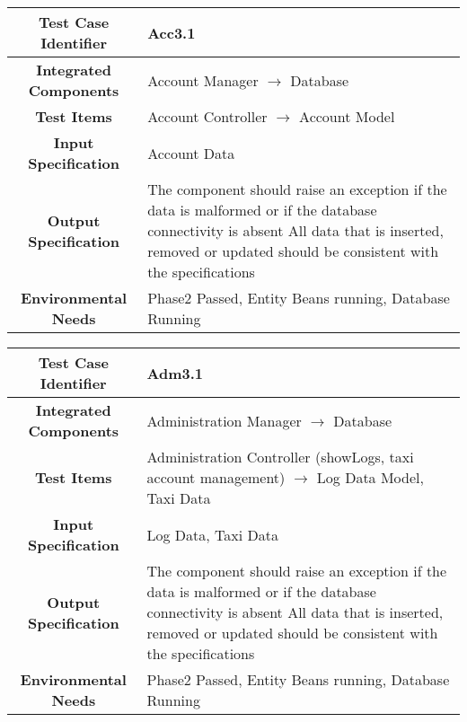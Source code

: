 \documentclass[11pt, a4paper,titlepage]{article}
\begin{document}
		\begin{tabularx}{\textwidth}{| c|X|}
			\hline \textbf{Test Case Identifier} & Acc3.1 \\
			\hline \textbf{Integrated Components} & Account Manager $\rightarrow $ Database \\
			\hline \textbf{Test Items} & Account Controller $\rightarrow $ Account Model \\
			\hline \textbf{Input Specification} & Account Data \\
			\hline \textbf{Output Specification} & The component should raise an exception if the data is malformed or if the database connectivity is absent \newline
			All data that is inserted, removed or updated should be consistent with the specifications\\
			\hline \textbf{Environmental Needs} & Phase2 Passed, Entity Beans running, Database Running \\
			\hline
		\end{tabularx}
		\newline
		
		\begin{tabularx}{\textwidth}{| c|X|}
			\hline \textbf{Test Case Identifier} & Adm3.1 \\
			\hline \textbf{Integrated Components} & Administration Manager $\rightarrow $ Database \\
			\hline \textbf{Test Items} & Administration Controller (showLogs, taxi account management) $\rightarrow $ Log Data Model, Taxi Data \\
			\hline \textbf{Input Specification} & Log Data, Taxi Data \\
			\hline \textbf{Output Specification} & The component should raise an exception if the data is malformed or if the database connectivity is absent \newline
			All data that is inserted, removed or updated should be consistent with the specifications\\
			\hline \textbf{Environmental Needs} & Phase2 Passed, Entity Beans running, Database Running \\
			\hline
		\end{tabularx}
		\newline
		
\end{document}
